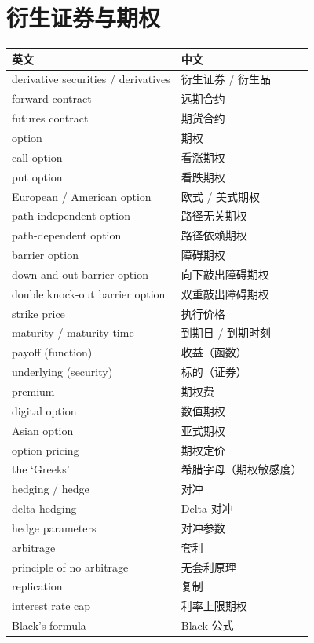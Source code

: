 \section{衍生证券与期权}

\begin{center}
\begin{tabular}{@{}L{6.4cm}L{7.4cm}@{}}
\toprule
英文 & 中文 \\
\midrule
derivative securities / derivatives & 衍生证券 / 衍生品 \\
forward contract & 远期合约 \\
futures contract & 期货合约 \\
option & 期权 \\
call option & 看涨期权 \\
put option & 看跌期权 \\
European / American option & 欧式 / 美式期权 \\
path-independent option & 路径无关期权 \\
path-dependent option & 路径依赖期权 \\
barrier option & 障碍期权 \\
down-and-out barrier option & 向下敲出障碍期权 \\
double knock-out barrier option & 双重敲出障碍期权 \\
strike price & 执行价格 \\
maturity / maturity time & 到期日 / 到期时刻 \\
payoff (function) & 收益（函数） \\
underlying (security) & 标的（证券） \\
premium & 期权费 \\
digital option & 数值期权 \\
Asian option & 亚式期权 \\
option pricing & 期权定价 \\
the `Greeks' & 希腊字母（期权敏感度） \\
hedging / hedge & 对冲 \\
delta hedging & Delta 对冲 \\
hedge parameters & 对冲参数 \\
arbitrage & 套利 \\
principle of no arbitrage & 无套利原理 \\
replication & 复制 \\
interest rate cap & 利率上限期权 \\
Black's formula & Black 公式 \\
\bottomrule
\end{tabular}
\end{center}

